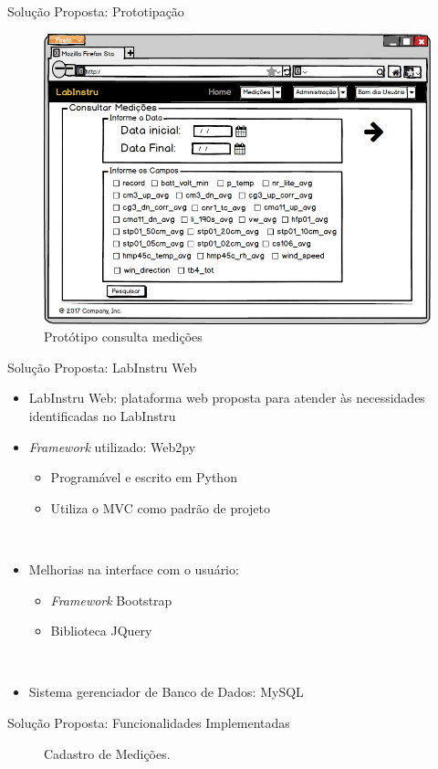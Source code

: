 \begin{frame}{Solução Proposta: Prototipação}
\begin{figure}[h!]
\centering
\includegraphics[width=0.6\linewidth]{./img/tela058}
\caption{Protótipo consulta medições} \label{fig:uc001}
\end{figure}
\end{frame}

\begin{frame}{Solução Proposta: LabInstru Web}
\begin{itemize}
	\item \alert{LabInstru Web}: plataforma web proposta para atender às necessidades identificadas no LabInstru
	\ \ \newline
	\item \emph{Framework} utilizado: Web2py
		\begin{itemize}
			\item Programável e escrito em Python
			\item Utiliza o MVC como padrão de projeto
		\end{itemize}
	\ \ \newline
	\item Melhorias na interface com o usuário:
	\begin{itemize}
		\item \emph{Framework} Bootstrap
		\item Biblioteca JQuery
	\end{itemize}
	\ \ \newline
	\item Sistema gerenciador de Banco de Dados: MySQL
\end{itemize}
\end{frame}

\begin{frame}{Solução Proposta: Funcionalidades Implementadas}
\begin{figure}[h!]
\centering
{}
\caption{Cadastro de Medições.} \label{fig:uc001}
\end{figure}
\end{frame}

